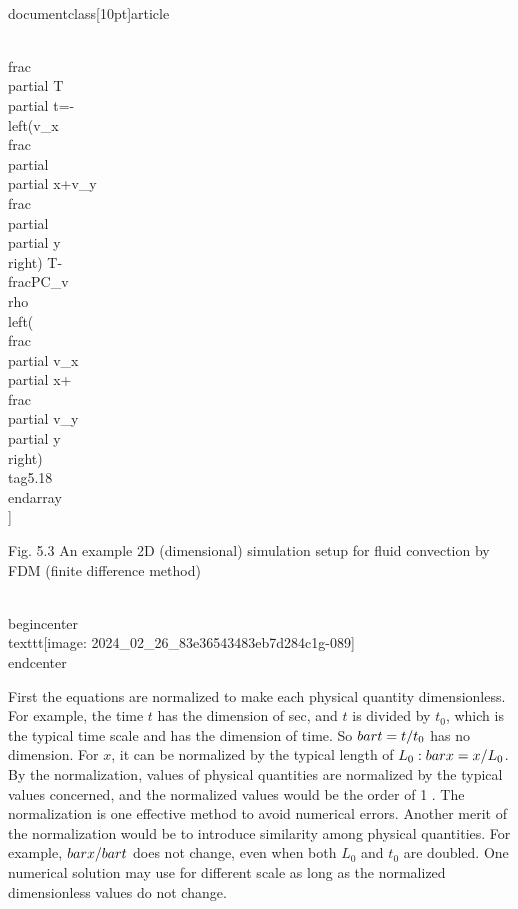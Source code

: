 \\documentclass[10pt]{article}
\begin{document}
\\frac{\\partial T}{\\partial t}=-\\left(v_{x} \\frac{\\partial}{\\partial x}+v_{y} \\frac{\\partial}{\\partial y}\\right) T-\\frac{P}{C_{v} \\rho}\\left(\\frac{\\partial v_{x}}{\\partial x}+\\frac{\\partial v_{y}}{\\partial y}\\right) \\tag{5.18}
\\end{array}
\\]

Fig. 5.3 An example 2D (dimensional) simulation setup for fluid convection by FDM (finite difference method)

\\begin{center}
\\texttt{[image: 2024\_02\_26\_83e36543483eb7d284c1g-089]}
\\end{center}

First the equations are normalized to make each physical quantity dimensionless. For example, the time $t$ has the dimension of sec, and $t$ is divided by $t_{0}$, which is the typical time scale and has the dimension of time. So $\\bar{t}=t / t_{0}$ has no dimension. For $x$, it can be normalized by the typical length of $L_{0}: \\bar{x}=x / L_{0}$. By the normalization, values of physical quantities are normalized by the typical values concerned, and the normalized values would be the order of 1 . The normalization is one effective method to avoid numerical errors. Another merit of the normalization would be to introduce similarity among physical quantities. For example, $\\bar{x} / \\bar{t}$ does not change, even when both $L_{0}$ and $t_{0}$ are doubled. One numerical solution may use for different scale as long as the normalized dimensionless values do not change.
\end{document}

